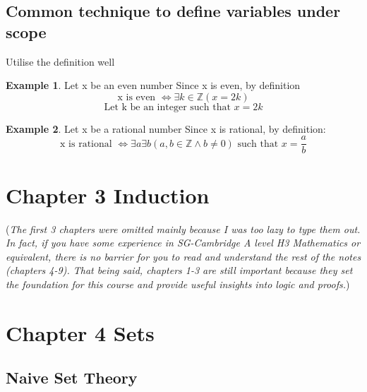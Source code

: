 \documentclass[14pt]{article}
\theoremstyle{definition}
\newtheorem*{example}{Example}
\begin{document}
\subsubsection{}
\subsubsection{}
\subsubsection{}
\newpage
\subsection*{Common technique to define variables under scope}
Utilise the definition well

\begin{example}
    Let x be an even number
    Since x is even, by definition 
    \[\text{x is even } \iff \exists k \in \mathbb{Z} (x = 2k)\]
    \[\text{Let k be an integer such that } x = 2k\]
\end{example}

\begin{example}
    Let x be a rational number
    Since x is rational, by definition:
    \[\text{x is rational } \iff \exists a \exists b (a, b \in \mathbb{Z} \land b \neq 0) \text{ such that } x = \frac{a}{b}\]
\end{example}

\section{Chapter 3 Induction}

(\textit{The first 3 chapters were omitted mainly because I was too lazy to type them out.
In fact, if you have some experience in SG-Cambridge A level H3 Mathematics or equivalent, 
there is no barrier for you to read and understand the rest of the notes (chapters
4-9). That being said,
chapters 1-3 are still important because they set the foundation for 
this course and provide useful insights into logic and proofs.})

\section{Chapter 4 Sets}
\subsection{Naive Set Theory}
\end{document}
